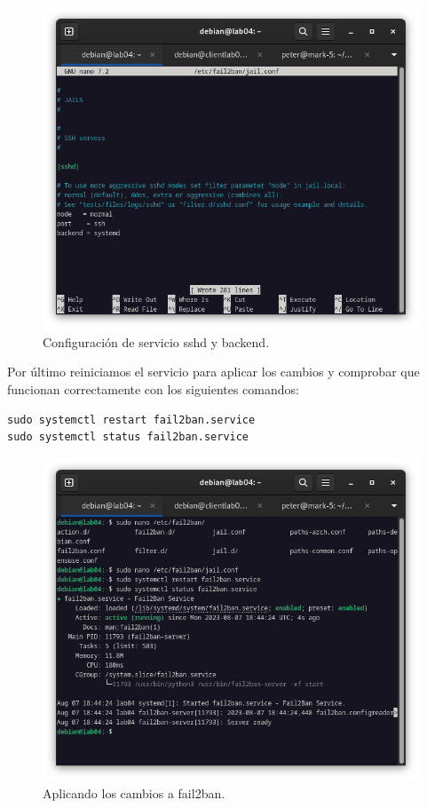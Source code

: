 \begin{figure}[H]
	\centering
	\includegraphics[scale=0.40]{04}
	\caption{Configuración de servicio sshd y backend.}
\end{figure}

Por último reiniciamos el servicio para aplicar los cambios y comprobar que funcionan correctamente con los siguientes comandos:

\begin{lstlisting}[style=mybash]
sudo systemctl restart fail2ban.service
sudo systemctl status fail2ban.service 
\end{lstlisting}

\begin{figure}[H]
	\centering
	\includegraphics[scale=0.40]{05}
	\caption{Aplicando los cambios a fail2ban.}
\end{figure}

